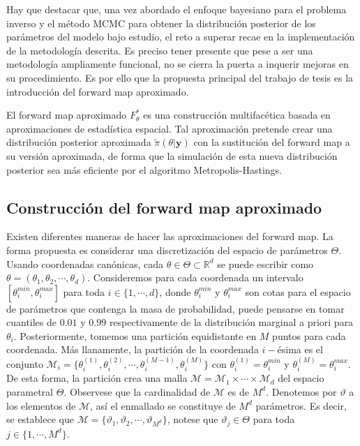 Hay que destacar que, una vez abordado el enfoque bayesiano para el problema inverso y el método MCMC para obtener la distribución posterior de los parámetros del modelo bajo estudio, el reto a superar recae en la implementación de la metodología descrita. Es preciso tener presente que pese a ser una metodología ampliamente funcional, no se cierra la puerta a inquerir mejoras en su procedimiento. Es por ello que la propuesta principal del trabajo de tesis es la introducción del forward map aproximado.

El forward map aproximado $F_{\theta}^{*}$ es una construcción multifacética basada en aproximaciones de estadística espacial. Tal aproximación pretende crear una distribución posterior aproximada $\tilde{\pi}(\theta|\mathbf{y})$ con la sustitución del forward map a su versión aproximada, de forma que la simulación de esta nueva distribución posterior sea más eficiente por el algoritmo Metropolis-Hastings. 

\subsection*{Construcción del forward map aproximado}
Existen diferentes maneras de hacer las aproximaciones del forward map. La forma propuesta es considerar una discretización del espacio de parámetros $\Theta$. Usando coordenadas canónicas, cada $\theta \in \Theta \subset \mathbb{R}^d$ se puede escribir como $\theta = (\theta_1, \theta_2, \cdots, \theta_d)$. Consideremos para cada coordenada un intervalo $[\theta_i^{min},\theta_i^{max}]$ para toda $i \in \{1,\cdots,d\}$, donde $\theta_i^{min}$ y $\theta_i^{max}$ son cotas para el espacio de parámetros que contenga la masa de probabilidad, puede pensarse en tomar cuantiles de $0.01$ y $0.99$ respectivamente de la distribución marginal a priori para $\theta_i$. Posteriormente, tomemos una partición equidistante en $M$ puntos para cada coordenada. Más llanamente, la partición de la coordenada $i-$ésima es el conjunto $\mathcal{M}_i =\{ \theta_i^{(1)}, \theta_i^{(2)},\cdots , \theta_i^{(M-1)}, \theta_i^{(M)}\}$ con $\theta_i^{(1)} = \theta_i^{min}$ y $\theta_i^{(M)} = \theta_i^{max}$. De esta forma, la partición crea una malla $\mathcal{M} = \mathcal{M}_1 \times \cdots \times \mathcal{M}_d$ del espacio parametral $\Theta$. Observese que la cardinalidad de $\mathcal{M}$ es de $M^d$. Denotemos por $\vartheta$ a los elementos de $\mathcal{M}$, así el enmallado se constituye de $M^d$ parámetros. Es decir, se establece que $\mathcal{M} = \{\vartheta_1, \vartheta_2, \cdots, \vartheta_{M^d}\}$, notese que $\vartheta_j \in \Theta$ para toda $j \in \{1,\cdots, M^d \}$.

